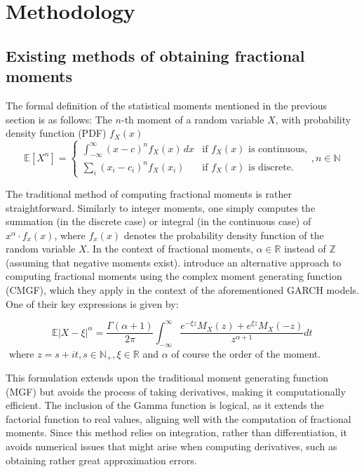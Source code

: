 \section{Methodology}\label{s:methodology}
\subsection{Existing methods of obtaining fractional moments}
The formal definition of the statistical moments mentioned in the previous section is as follows: The \(n\)-th moment of a random variable \(X\), with probability density function (PDF) \(f_X(x)\) 
\[
\mathbb{E}[X^n] = 
\begin{cases} 
\int_{-\infty}^{\infty} (x - c)^n f_X(x) \, dx & \text{if } f_X(x) \text{ is continuous,} \\ 
\sum_{i} (x_i - c_ i)^n f_X(x_i) & \text{if } f_X(x) \text{ is discrete.} 
\end{cases}, n \in \mathbb{N}
\]

The traditional method of computing fractional moments is rather straightforward. Similarly to integer moments, one simply computes the summation (in the discrete case) or integral (in the continuous case) of \(x^\alpha \cdot f_x(x)\), where \(f_x(x)\) denotes the probability density function of the random variable \(X\). In the context of fractional moments, \(\alpha \in \mathbb{R}\) instead of \(\mathbb{Z}\) (assuming that negative moments exist). \cite{hansen2024} introduce an alternative approach to computing fractional moments using the complex moment generating function (CMGF), which they apply in the context of the aforementioned GARCH models. One of their key expressions is given by:

\[\mathbb{E}\left| X - \xi \right|^\alpha = \frac{\Gamma(\alpha+1)}{2\pi} \int_{-\infty}^{\infty} \frac{e^{-\xi z} M_X(z) + e^{\xi z} M_X(-z)}{z^{\alpha+1}} dt\] \(\text{ where } z = s + it, s \in \mathbb{N_+}, \xi \in \mathbb{R} \) and \(\alpha\) of course the order of the moment.

This formulation extends upon the traditional moment generating function (MGF) but avoids the process of taking derivatives, making it computationally efficient. The inclusion of the Gamma function is logical, as it extends the factorial function to real values, aligning well with the computation of fractional moments. Since this method relies on integration, rather than differentiation, it avoids numerical issues that might arise when computing derivatives, such as obtaining rather great approximation errors.

